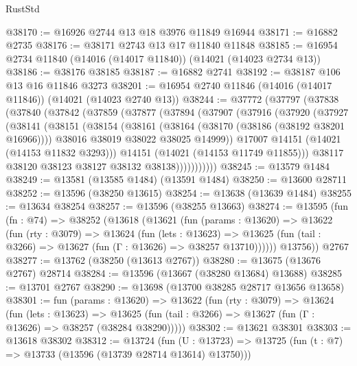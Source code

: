 \begin{lexlean}{RustStd}
\begin{coremodule}
@38170 := @16926 @2744 @13 @18 @3976 @11849 @16944
@38171 := @16882 @2735
@38176 := @38171 @2743 @13 @17 @11840 @11848
@38185 := @16954 @2734 @11840 (@14016 (@14017 @11840)) (@14021 (@14023 @2734 @13))
@38186 := @38176 @38185
@38187 := @16882 @2741
@38192 := @38187 @106 @13 @16 @11846 @3273
@38201 := @16954 @2740 @11846 (@14016 (@14017 @11846)) (@14021 (@14023 @2740 @13))
@38244 := @37772
    (@37797
      (@37838
        (@37840
          (@37842
            (@37859
              (@37877
                (@37894
                  (@37907
                    (@37916
                      (@37920
                        (@37927
                          (@38141
                            (@38151
                              (@38154
                                (@38161
                                  (@38164 (@38170 (@38186 (@38192 @38201 @16966))))
                                  @38016
                                  @38019
                                  @38022
                                  @38025
                                  @14999))
                              @17007
                              @14151
                              (@14021 (@14153 @11832 @3293)))
                            @14151
                            (@14021 (@14153 @11749 @11855)))
                          @38117
                          @38120
                          @38123
                          @38127
                          @38132
                          @38138)))))))))))
@38245 := @13579 @1484
@38249 := @13581 (@13585 @1484) (@13591 @1484)
@38250 := @13600 @28711
@38252 := @13596 (@38250 @13615)
@38254 := @13638 (@13639 @1484)
@38255 := @13634 @38254
@38257 := @13596 (@38255 @13663)
@38274 := @13595
    (fun (fn : @74) =>
    @38252
      (@13618
        (@13621
          (fun (params : @13620) =>
          @13622
            (fun (rty : @3079) =>
            @13624
              (fun (lets : @13623) =>
              @13625 (fun (tail : @3266) => @13627 (fun (Γ : @13626) => @38257 @13710))))))
        @13756))
    @2767
@38277 := @13762 (@38250 (@13613 @2767))
@38280 := @13675 (@13676 @2767) @28714
@38284 := @13596 (@13667 (@38280 @13684) @13688)
@38285 := @13701 @2767
@38290 := @13698 (@13700 @38285 @28717 @13656 @13658)
@38301 := fun (params : @13620) =>
  @13622
    (fun (rty : @3079) =>
    @13624
      (fun (lets : @13623) =>
      @13625 (fun (tail : @3266) => @13627 (fun (Γ : @13626) => @38257 (@38284 @38290)))))
@38302 := @13621 @38301
@38303 := @13618 @38302
@38312 := @13724
    (fun (U : @13723) => @13725 (fun (t : @7) => @13733 (@13596 (@13739 @28714 @13614) @13750)))

\end{coremodule}
\end{lexlean}
